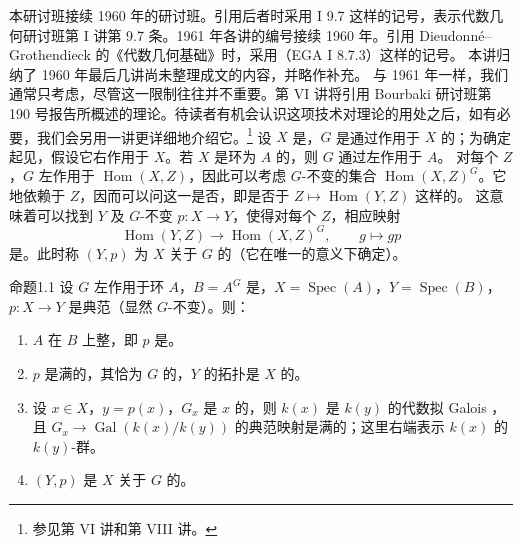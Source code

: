 本研讨班接续 1960 年的研讨班。引用后者时采用 I 9.7 这样的记号，表示代数几何研讨班第 I 讲第 9.7 条。1961 年各讲的编号接续 1960 年。引用 Dieudonné--Grothendieck 的《代数几何基础》时，采用（EGA I 8.7.3）这样的记号。
本讲归纳了 1960 年最后几讲尚未整理成文的内容，并略作补充。
与 1961 年一样，我们通常只考虑，尽管这一限制往往并不重要。第 VI 讲将引用 Bourbaki 研讨班第 190 号报告所概述的理论。待读者有机会认识这项技术对理论的用处之后，如有必要，我们会另用一讲更详细地介绍它。\footnote{参见第 VI 讲和第 VIII 讲。}
设 $X$ 是，$G$ 是通过作用于 $X$ 的；为确定起见，假设它右作用于 $X$。若 $X$ 是环为 $A$ 的，则 $G$ 通过左作用于 $A$。
对每个 $Z$，$G$ 左作用于 $\operatorname{Hom}(X,Z)$，因此可以考虑 $G$-不变的集合 $\operatorname{Hom}(X,Z)^G$。它地依赖于 $Z$，因而可以问这一是否，即是否于 $Z\mapsto\operatorname{Hom}(Y,Z)$ 这样的。
这意味着可以找到 $Y$ 及 $G$-不变 $p:X\to Y$，使得对每个 $Z$，相应映射
\[\operatorname{Hom}(Y,Z)\longrightarrow\operatorname{Hom}(X,Z)^G,\qquad g\longmapsto gp\]
是。此时称 $(Y,p)$ 为 $X$ 关于 $G$ 的（它在唯一的意义下确定）。
\begin{SGAresult}{命题}{1.1}
设 $G$ 左作用于环 $A$，$B=A^G$ 是，$X=\operatorname{Spec}(A)$，$Y=\operatorname{Spec}(B)$，$p:X\to Y$ 是典范（显然 $G$-不变）。则：
\begin{enumerate}
\item[(i)] $A$ 在 $B$ 上整，即 $p$ 是。
\item[(ii)] $p$ 是满的，其恰为 $G$ 的，$Y$ 的拓扑是 $X$ 的。
\item[(iii)] 设 $x\in X$，$y=p(x)$，$G_x$ 是 $x$ 的，则 $k(x)$ 是 $k(y)$ 的代数拟 Galois ，且 $G_x\to\operatorname{Gal}(k(x)/k(y))$ 的典范映射是满的；这里右端表示 $k(x)$ 的 $k(y)$-群。
\item[(iv)] $(Y,p)$ 是 $X$ 关于 $G$ 的。
\end{enumerate}
\end{SGAresult}
